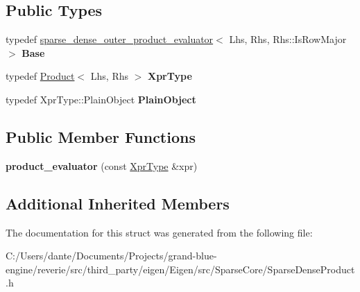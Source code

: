 \subsection*{Public Types}
\begin{DoxyCompactItemize}
\item 
\mbox{\label{struct_eigen_1_1internal_1_1product__evaluator_3_01_product_3_01_lhs_00_01_rhs_00_01_default_pro2587512d8613ab7eaf4e89d5bc171599_a60691296715e5502b4b2e195c53c8abb}} 
typedef \mbox{\hyperlink{struct_eigen_1_1internal_1_1sparse__dense__outer__product__evaluator}{sparse\+\_\+dense\+\_\+outer\+\_\+product\+\_\+evaluator}}$<$ Lhs, Rhs, Rhs\+::\+Is\+Row\+Major $>$ {\bfseries Base}
\item 
\mbox{\label{struct_eigen_1_1internal_1_1product__evaluator_3_01_product_3_01_lhs_00_01_rhs_00_01_default_pro2587512d8613ab7eaf4e89d5bc171599_a04a0e1d182a704d7fe9c877b2cdede47}} 
typedef \mbox{\hyperlink{class_eigen_1_1_product}{Product}}$<$ Lhs, Rhs $>$ {\bfseries Xpr\+Type}
\item 
\mbox{\label{struct_eigen_1_1internal_1_1product__evaluator_3_01_product_3_01_lhs_00_01_rhs_00_01_default_pro2587512d8613ab7eaf4e89d5bc171599_a05fa80992891535caf1d41c40670754c}} 
typedef Xpr\+Type\+::\+Plain\+Object {\bfseries Plain\+Object}
\end{DoxyCompactItemize}
\subsection*{Public Member Functions}
\begin{DoxyCompactItemize}
\item 
\mbox{\label{struct_eigen_1_1internal_1_1product__evaluator_3_01_product_3_01_lhs_00_01_rhs_00_01_default_pro2587512d8613ab7eaf4e89d5bc171599_a8ccfa8eb6b5fbf881a53e72b3d75f2f1}} 
{\bfseries product\+\_\+evaluator} (const \mbox{\hyperlink{class_eigen_1_1_product}{Xpr\+Type}} \&xpr)
\end{DoxyCompactItemize}
\subsection*{Additional Inherited Members}


The documentation for this struct was generated from the following file\+:\begin{DoxyCompactItemize}
\item 
C\+:/\+Users/dante/\+Documents/\+Projects/grand-\/blue-\/engine/reverie/src/third\+\_\+party/eigen/\+Eigen/src/\+Sparse\+Core/Sparse\+Dense\+Product.\+h\end{DoxyCompactItemize}
